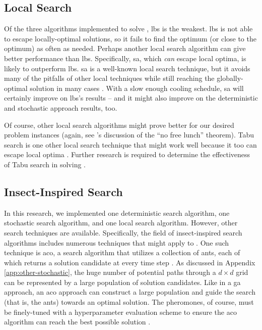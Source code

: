 \documentclass[../main.tex]{subfiles}
\begin{document}
\subsection{Local Search}\label{app:other-local}

Of the three algorithms implemented to solve \prob, \acl{lbs} is the weakest. \ac{lbs} is not able to escape locally-optimal solutions, so it fails to find the optimum (or close to the optimum) as often as needed. Perhaps another local search algorithm can give better performance than \ac{lbs}. Specifically, \ac{sa}, which \textit{can} escape local optima, is likely to outperform \ac{lbs}. \ac{sa} is a well-known local search technique, but it avoids many of the pitfalls of other local techniques while still reaching the globally-optimal solution in many cases \cite{Kirkpatrick1983, Talbi2009}. With a slow enough cooling schedule, \ac{sa} will certainly improve on \ac{lbs}'s \probs results -- and it might also improve on the deterministic and stochastic approach results, too.

Of course, other local search algorithms might prove better for our desired problem instances (again, see \cite{Wolpert1997}'s discussion of the ``no free lunch'' theorem). Tabu search is one other local search technique that might work well because it too can escape local optima \cite{Glover1986}. Further research is required to determine the effectiveness of Tabu search in solving \prob.

\subsection{Insect-Inspired Search}\label{app:other-insect}

In this research, we implemented one deterministic search algorithm, one stochastic search algorithm, and one local search algorithm. However, other search techniques are available. Specifically, the field of insect-inspired search algorithms includes numerous techniques that might apply to \prob. One such technique is \ac{aco}, a search algorithm that utilizes a collection of ants, each of which returns a solution candidate at every time step \cite{Moyson1988, handout:ants}. As discussed in Appendix \ref{app:other-stochastic}, the huge number of potential paths through a $d\times d$ grid can be represented by a large population of solution candidates. Like in a \ac{ga} approach, an \ac{aco} approach can construct a large population and guide the search (that is, the ants) towards an optimal solution. The pheromones, of course, must be finely-tuned with a hyperparameter evaluation scheme to ensure the \ac{aco} algorithm can reach the best possible solution \cite{handout:ants}.
\end{document}
